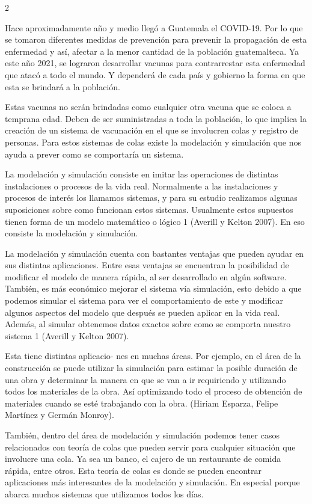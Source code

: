 \documentclass[12pt,spanish,Letterpaper,openany]{book}
\begin{document}
\begin {multicols}{2}

Hace aproximadamente año y medio llegó a Guatemala el COVID-19. Por lo que se tomaron
diferentes medidas de prevención para prevenir la propagación de esta enfermedad y así,
afectar a la menor cantidad de la población guatemalteca. Ya este año 2021, se lograron
desarrollar vacunas para contrarrestar esta enfermedad que atacó a todo el mundo. Y
dependerá de cada país y gobierno la forma en que esta se brindará a la población.

Estas vacunas no serán brindadas como cualquier otra vacuna que se coloca a temprana edad.
Deben de ser suministradas a toda la población, lo que implica la creación de un sistema de
vacunación en el que se involucren colas y registro de personas. Para estos sistemas de colas
existe la modelación y simulación que nos ayuda a prever como se comportaría un sistema.

La modelación y simulación consiste en imitar las operaciones de distintas instalaciones o
procesos de la vida real. Normalmente a las instalaciones y procesos de interés los llamamos
sistemas, y para su estudio realizamos algunas suposiciones sobre como funcionan estos
sistemas. Usualmente estos supuestos tienen forma de un modelo matemático o lógico 1
(Averill y Kelton 2007). En eso consiste la modelación y simulación.

La modelación y simulación cuenta con bastantes ventajas que pueden ayudar en sus distintas
aplicaciones. Entre esas ventajas se encuentran la posibilidad de modificar el modelo de
manera rápida, al ser desarrollado en algún software. También, es más económico mejorar el
sistema vía simulación, esto debido a que podemos simular el sistema para ver el
comportamiento de este y modificar algunos aspectos del modelo que después se pueden
aplicar en la vida real. Además, al simular obtenemos datos exactos sobre como se comporta
nuestro sistema 1 (Averill y Kelton 2007).

Esta tiene distintas aplicacio-
nes en muchas áreas. Por ejemplo, en el área de la construcción
se puede utilizar la simulación para estimar la posible duración de una obra y determinar la
manera en que se van a ir requiriendo y utilizando todos los materiales de la obra. Así
optimizando todo el proceso de obtención de materiales cuando se esté trabajando con la
obra. (Hiriam Esparza, Felipe Martínez y Germán Monroy).

También, dentro del área de modelación y simulación podemos tener casos relacionados con
teoría de colas que pueden servir para cualquier situación que involucre una cola. Ya sea un
banco, el cajero de un restaurante de comida rápida, entre otros. Esta teoría de colas es donde
se pueden encontrar aplicaciones más interesantes de la modelación y simulación. En especial
porque abarca muchos sistemas que utilizamos todos los días.


\end{multicols}
\end{document}
